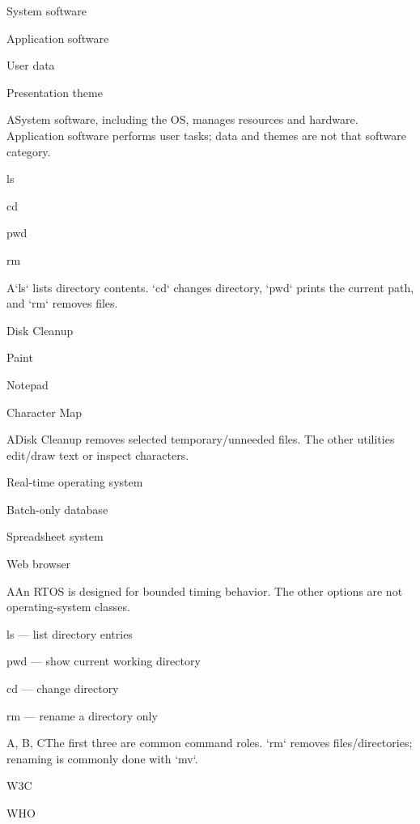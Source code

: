 \begin{enumerate}[label=\textbf{Q\arabic*.}, leftmargin=*]
  {\item System software
   \item Application software
   \item User data
   \item Presentation theme}
  {A}{System software, including the OS, manages resources and hardware. Application software performs user tasks; data and themes are not that software category.}
  {\item ls
   \item cd
   \item pwd
   \item rm}
  {A}{`ls` lists directory contents. `cd` changes directory, `pwd` prints the current path, and `rm` removes files.}
  {\item Disk Cleanup
   \item Paint
   \item Notepad
   \item Character Map}
  {A}{Disk Cleanup removes selected temporary/unneeded files. The other utilities edit/draw text or inspect characters.}
  {\item Real-time operating system
   \item Batch-only database
   \item Spreadsheet system
   \item Web browser}
  {A}{An RTOS is designed for bounded timing behavior. The other options are not operating-system classes.}
  {\item ls --- list directory entries
   \item pwd --- show current working directory
   \item cd --- change directory
   \item rm --- rename a directory only}
  {A, B, C}{The first three are common command roles. `rm` removes files/directories; renaming is commonly done with `mv`.}
\fi
\ifnum{}
  {\item W3C
   \item WHO
}
\end{enumerate}
